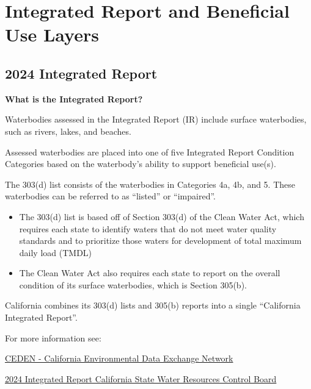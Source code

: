 \documentclass[
  letterpaper,
  DIV=11,
  numbers=noendperiod]{scrreprt}
\begin{document}
\section{Integrated Report and Beneficial Use
Layers}\label{integrated-report-and-beneficial-use-layers}

\subsection{2024 Integrated Report}\label{integrated-report}

\begin{tcolorbox}[enhanced jigsaw, colframe=quarto-callout-important-color-frame, bottomtitle=1mm, opacitybacktitle=0.6, breakable, bottomrule=.15mm, opacityback=0, colback=white, left=2mm, leftrule=.75mm, coltitle=black, rightrule=.15mm, toprule=.15mm, titlerule=0mm, toptitle=1mm, arc=.35mm, title=\textcolor{quarto-callout-important-color}{\faExclamation}\hspace{0.5em}{Important}, colbacktitle=quarto-callout-important-color!10!white]

\textbf{What is the Integrated Report?}

Waterbodies assessed in the Integrated Report (IR) include surface
waterbodies, such as rivers, lakes, and beaches.

Assessed waterbodies are placed into one of five Integrated Report
Condition Categories based on the waterbody's ability to support
beneficial use(s).

The 303(d) list consists of the waterbodies in Categories 4a, 4b, and 5.
These waterbodies can be referred to as ``listed'' or ``impaired''.

\begin{itemize}
\item
  The 303(d) list is based off of Section 303(d) of the Clean Water Act,
  which requires each state to identify waters that do not meet water
  quality standards and to prioritize those waters for development of
  total maximum daily load (TMDL)
\item
  The Clean Water Act also requires each state to report on the overall
  condition of its surface waterbodies, which is Section 305(b).
\end{itemize}

California combines its 303(d) lists and 305(b) reports into a single
``California Integrated Report''.

For more information see:

\href{https://ceden.org/303d_list.shtml}{CEDEN - California
Environmental Data Exchange Network}

\href{https://www.waterboards.ca.gov/water_issues/programs/water_quality_assessment/2024-integrated-report.html}{2024
Integrated Report \textbar{} California State Water Resources Control
Board}

\end{tcolorbox}
\end{document}
